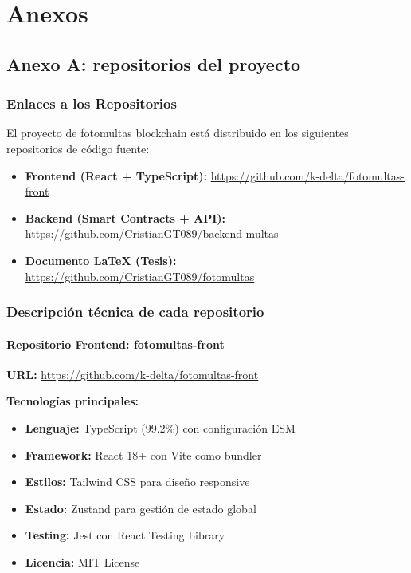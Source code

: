 \section{Anexos}



\subsection{Anexo A: repositorios del proyecto}

\subsubsection{Enlaces a los Repositorios}

El proyecto de fotomultas blockchain está distribuido en los siguientes repositorios de código fuente:

\begin{itemize}
    \item \textbf{Frontend (React + TypeScript):} \url{https://github.com/k-delta/fotomultas-front}
    \item \textbf{Backend (Smart Contracts + API):} \url{https://github.com/CristianGT089/backend-multas}
    \item \textbf{Documento LaTeX (Tesis):} \url{https://github.com/CristianGT089/fotomultas}
\end{itemize}

\subsubsection{Descripción técnica de cada repositorio}

\paragraph{Repositorio Frontend: fotomultas-front}
\textbf{URL:} \url{https://github.com/k-delta/fotomultas-front}

\textbf{Tecnologías principales:}
\begin{itemize}
    \item \textbf{Lenguaje:} TypeScript (99.2\%) con configuración ESM
    \item \textbf{Framework:} React 18+ con Vite como bundler
    \item \textbf{Estilos:} Tailwind CSS para diseño responsive
    \item \textbf{Estado:} Zustand para gestión de estado global
    \item \textbf{Testing:} Jest con React Testing Library
    \item \textbf{Licencia:} MIT License
\end{itemize}


